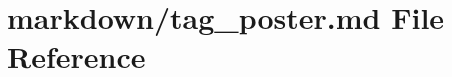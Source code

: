\hypertarget{tag__poster_8md}{}\section{markdown/tag\+\_\+poster.md File Reference}
\label{tag__poster_8md}
